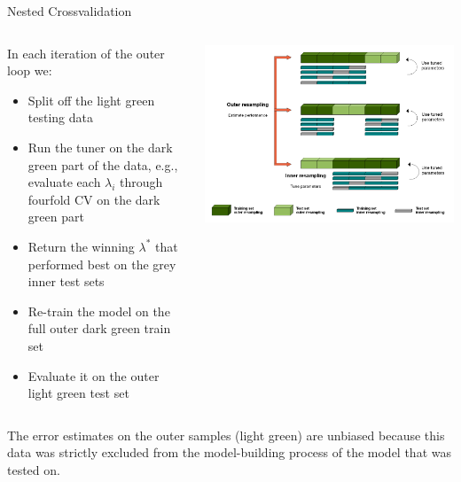 \begin{frame}{Nested Crossvalidation}
\framebreak

\vspace{1cm}
\begin{columns}[c, onlytextwidth]
\hspace*{-0.3cm}
\begin{footnotesize}
In each iteration of the outer loop we:
\begin{itemize}
\item Split off the light green testing data
\item Run the tuner on the dark green part of the data, e.g.,
  evaluate each $\lambda_i$ through fourfold CV on the dark green part
\item Return the winning $\lambda^*$ that performed best on the grey inner test sets
\item Re-train the model on the full outer dark green train set
\item Evaluate it on the outer light green test set
\end{itemize}
\end{footnotesize}

\vspace*{-0.3cm}
\begin{center}\includegraphics[width = \textwidth]{images/Nested_Resampling.png}\end{center}
\end{columns}

\begin{footnotesize}
The error estimates on the outer samples (light green) are unbiased because this data was strictly excluded from the model-building process of the model that was tested on.
\end{footnotesize}

\end{frame}


